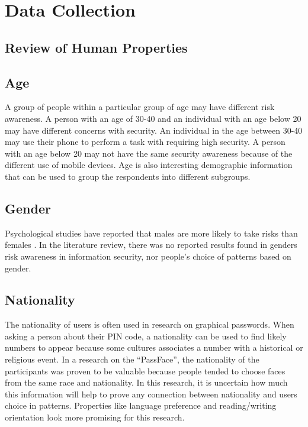 \section{Data Collection}\label{sec:datacollection}

	\subsection{Review of Human Properties}

      
     	\subsection*{Age} 
      A group of people within a particular group of age may have different risk awareness. A person with an age of 30-40 and an individual with an age below 20 may have different concerns with security. An individual in the age between 30-40 may use their phone to perform a task with requiring high security. A person with an age below 20 may not have the same security awareness because of the different use of mobile devices. Age is also interesting demographic information that can be used to group the respondents into different subgroups.

      \subsection*{Gender} 
      Psychological studies have reported that males are more likely to take risks than females \cite{Byrnes}. In the literature review, there was no reported results found in genders risk awareness in information security, nor people's choice of patterns based on gender.

      \subsection*{Nationality} 
      The nationality of users is often used in research on graphical passwords. When asking a person about their PIN code, a nationality can be used to find likely numbers to appear because some cultures associates a number with a historical or religious event. In a research on the ``PassFace'', the nationality of the participants was proven to be valuable because people tended to choose faces from the same race and nationality. In this research, it is uncertain how much this information will help to prove any connection between nationality and users choice in patterns. Properties like language preference and reading/writing orientation look more promising for this research.

